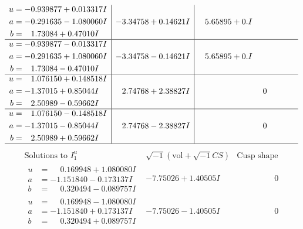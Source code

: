 \documentclass[1p]{elsarticle_modified}
\theoremstyle{definition}
\newcommand{\I}{\sqrt{-1}}
\begin{document}
$$\begin{array}{c|c|c}
\begin{aligned}
u &= -0.939877 + 0.013317 I \\
a &= -0.291635 - 1.080060 I \\
b &= \phantom{-}1.73084 + 0.47010 I\end{aligned}
 & -3.34758 + 0.14621 I & \phantom{-}5.65895 + 0. I\phantom{ +0.000000I} \\ \hline\begin{aligned}
u &= -0.939877 - 0.013317 I \\
a &= -0.291635 + 1.080060 I \\
b &= \phantom{-}1.73084 - 0.47010 I\end{aligned}
 & -3.34758 - 0.14621 I & \phantom{-}5.65895 + 0. I\phantom{ +0.000000I} \\ \hline\begin{aligned}
u &= \phantom{-}1.076150 + 0.148518 I \\
a &= -1.37015 + 0.85044 I \\
b &= \phantom{-}2.50989 - 0.59662 I\end{aligned}
 & \phantom{-}2.74768 + 2.38827 I & \phantom{-0.000000 } 0 \\ \hline\begin{aligned}
u &= \phantom{-}1.076150 - 0.148518 I \\
a &= -1.37015 - 0.85044 I \\
b &= \phantom{-}2.50989 + 0.59662 I\end{aligned}
 & \phantom{-}2.74768 - 2.38827 I & \phantom{-0.000000 } 0\\
 \hline 
 \end{array}$$\newpage$$\begin{array}{c|c|c}  
\text{Solutions to }I^u_{1}& \I (\text{vol} + \sqrt{-1}CS) & \text{Cusp shape}\\
 \hline 
\begin{aligned}
u &= \phantom{-}0.169948 + 1.080080 I \\
a &= -1.151840 - 0.173137 I \\
b &= \phantom{-}0.320494 - 0.089757 I\end{aligned}
 & -7.75026 + 1.40505 I & \phantom{-0.000000 } 0 \\ \hline\begin{aligned}
u &= \phantom{-}0.169948 - 1.080080 I \\
a &= -1.151840 + 0.173137 I \\
b &= \phantom{-}0.320494 + 0.089757 I\end{aligned}
 & -7.75026 - 1.40505 I & \phantom{-0.000000 } 0 \\ \hline\begin{aligned}

\end{aligned}
\end{array}$$
\end{document}
